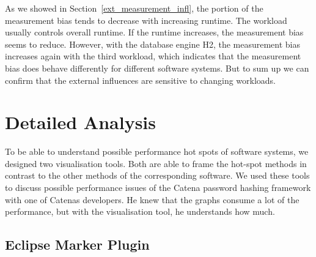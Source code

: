 As we showed in Section~\ref{ext_measurement_infl}, the portion of the measurement bias tends to decrease with increasing runtime. The workload usually controls overall runtime. If the runtime increases, the measurement bias seems to reduce. However, with the database engine H2, the measurement bias increases again with the third workload, which indicates that the measurement bias does behave differently for different software systems.
But to sum up we can confirm that the external influences are sensitive to changing workloads.


\section{Detailed Analysis}
\label{delailed_analysis}

To be able to understand possible performance hot spots of software systems, we designed two visualisation tools. Both are able to frame the hot-spot methods in contrast to the other methods of the corresponding software. We used these tools to discuss possible performance issues of the Catena password hashing framework with one of Catenas developers. He knew that the graphs consume a lot of the performance, but with the visualisation tool, he understands how much.






\subsection{Eclipse Marker Plugin}
\label{eclipse_plugin}

